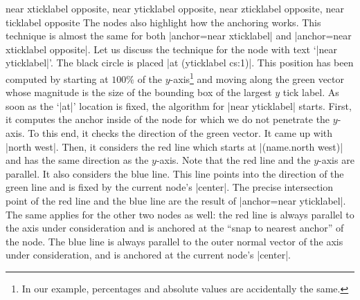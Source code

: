 \begin{anchorlist}{%
    near xticklabel opposite,
    near yticklabel opposite,
    near zticklabel opposite,
    near ticklabel opposite%
}
    The nodes also highlight how the anchoring works. This technique is almost
    the same for both |anchor=near xticklabel| and
    |anchor=near xticklabel opposite|. Let us discuss the technique for the
    node with text `|near yticklabel|'. The black circle is placed
    |at (yticklabel cs:1)|. This position has been computed by starting at
    $100\%$ of the $y$-axis\footnote{In our example, percentages and absolute
    values are accidentally the same.} and moving along the green vector whose
    magnitude is the size of the bounding box of the largest $y$ tick label. As
    soon as the `|at|' location is fixed, the algorithm for |near yticklabel|
    starts. First, it computes the anchor inside of the node for which we do
    not penetrate the $y$-axis. To this end, it checks the direction of the
    green vector. It came up with |north west|. Then, it considers the red line
    which starts at |(name.north west)| and has the same direction as the
    $y$-axis. Note that the red line and the $y$-axis are parallel. It also
    considers the blue line. This line points into the direction of the green
    line and is fixed by the current node's |center|. The precise intersection
    point of the red line and the blue line are the result of
    |anchor=near yticklabel|. The same applies for the other two nodes as well:
    the red line is always parallel to the axis under consideration and is
    anchored at the ``snap to nearest anchor'' of the node. The blue line is
    always parallel to the outer normal vector of the axis under consideration,
    and is anchored at the current node's |center|.
\end{anchorlist}


